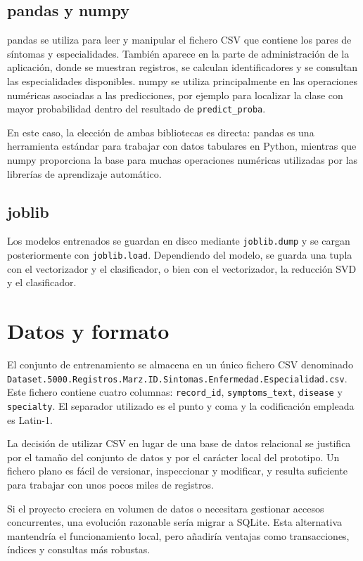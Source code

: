 \subsection{pandas y numpy}

pandas se utiliza para leer y manipular el fichero CSV que contiene los pares de síntomas y especialidades. También aparece en la parte de administración de la aplicación, donde se muestran registros, se calculan identificadores y se consultan las especialidades disponibles. numpy se utiliza principalmente en las operaciones numéricas asociadas a las predicciones, por ejemplo para localizar la clase con mayor probabilidad dentro del resultado de \texttt{predict\_proba}.

En este caso, la elección de ambas bibliotecas es directa: pandas es una herramienta estándar para trabajar con datos tabulares en Python, mientras que numpy proporciona la base para muchas operaciones numéricas utilizadas por las librerías de aprendizaje automático.

\subsection{joblib}

Los modelos entrenados se guardan en disco mediante \texttt{joblib.dump} y se cargan posteriormente con \texttt{joblib.load}. Dependiendo del modelo, se guarda una tupla con el vectorizador y el clasificador, o bien con el vectorizador, la reducción SVD y el clasificador.

\section{Datos y formato}

El conjunto de entrenamiento se almacena en un único fichero CSV denominado \texttt{Dataset.5000.Registros.Marz.ID.Sintomas.Enfermedad.Especialidad.csv}. Este fichero contiene cuatro columnas: \texttt{record\_id}, \texttt{symptoms\_text}, \texttt{disease} y \texttt{specialty}. El separador utilizado es el punto y coma y la codificación empleada es Latin-1.

La decisión de utilizar CSV en lugar de una base de datos relacional se justifica por el tamaño del conjunto de datos y por el carácter local del prototipo. Un fichero plano es fácil de versionar, inspeccionar y modificar, y resulta suficiente para trabajar con unos pocos miles de registros.

Si el proyecto creciera en volumen de datos o necesitara gestionar accesos concurrentes, una evolución razonable sería migrar a SQLite. Esta alternativa mantendría el funcionamiento local, pero añadiría ventajas como transacciones, índices y consultas más robustas.

